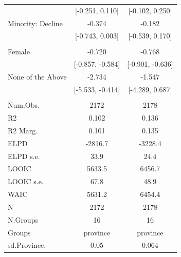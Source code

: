 \documentclass[
  10,
  letterpaper,
  DIV=11,
  numbers=noendperiod]{scrartcl}
\begin{document}
\begin{table}
\begin{tabular}[t]{lcc}
\hspace{1em} & {}[-0.251, 0.110] & {}[-0.102, 0.250]\\
\hspace{1em}Minority: Decline & -0.374 & -0.182\\
\hspace{1em} & {}[-0.743, 0.003] & {}[-0.539, 0.170]\\
\addlinespace[0.3em]
\multicolumn{3}{l}{\cellcolor[HTML]{3498DB}{\textbf{Gender}}}\\
\hspace{1em}Female & -0.720 & -0.768\\
\hspace{1em} & {}[-0.857, -0.584] & {}[-0.901, -0.636]\\
\hspace{1em}None of the Above & -2.734 & -1.547\\
\hspace{1em} & {}[-5.533, -0.414] & {}[-4.289, 0.687]\\
\midrule
\addlinespace[0.3em]
\multicolumn{3}{l}{\cellcolor[HTML]{3498DB}{\textbf{Intercept}}}\\
\hspace{1em}Num.Obs. & 2172 & 2178\\
\hspace{1em}R2 & 0.102 & 0.136\\
\hspace{1em}R2 Marg. & 0.101 & 0.135\\
\hspace{1em}ELPD & -2816.7 & -3228.4\\
\hspace{1em}ELPD s.e. & 33.9 & 24.4\\
\hspace{1em}LOOIC & 5633.5 & 6456.7\\
\hspace{1em}LOOIC s.e. & 67.8 & 48.9\\
\hspace{1em}WAIC & 5631.2 & 6454.4\\
N & 2172 & 2178\\
N.Groups & 16 & 16\\
Groups & province & province\\
sd.Province. & 0.05 & 0.064\\
\bottomrule
\end{tabular}
\end{table}


  
\end{document}
